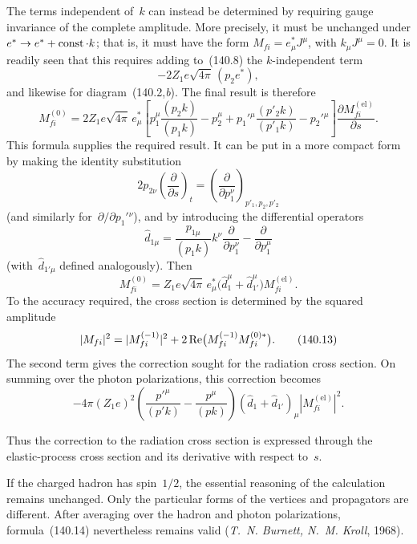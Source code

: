 The terms independent of~$k$ can instead be determined by requiring gauge invariance of the complete amplitude. More precisely, it must be unchanged under $e^*\to e^*+\mathop{\rm const}\nolimits\cdot k$; that is, it must have the form $M_{fi}=e^*_{\mu}J^\mu$, with $k_\mu J^\mu=0$. It is readily seen that this requires adding to~(140.8) the $k$-independent term
\[
-2Z_1e\sqrt{4\pi}\,(p_2e^*),
\]
and likewise for diagram~(140.2,\textit{b}). The final result is therefore
\begin{equation}
M_{fi}^{(0)}=2Z_1e\sqrt{4\pi}\,e^*_{\mu}
\left[p_1^\mu\frac{(p_2k)}{(p_1k)}-p_2^\mu
+p_1'{}^\mu\frac{(p'_2k)}{(p'_1k)}-p_2'{}^\mu\right]
\frac{\partial M_{fi}^{(\mathrm{el})}}{\partial s}.
\tag{140.10}
\end{equation}
This formula supplies the required result. It can be put in a more compact form by making the identity substitution
\[
2p_{2\nu}\left(\frac{\partial}{\partial s}\right)_t
=\left(\frac{\partial}{\partial p_1^\nu}\right)_{p'_1,p_2,p'_2}
\]
(and similarly for~$\partial/\partial p_1'{}^\nu$), and by introducing the differential operators
\begin{equation}
\widehat d_{1\mu}=\frac{p_{1\mu}}{(p_1k)}k^\nu\frac{\partial}{\partial p_1^\nu}
-\frac{\partial}{\partial p_1^\mu}
\tag{140.11}
\end{equation}
(with~$\widehat d_{1'\mu}$ defined analogously). Then
\begin{equation}
M_{fi}^{(0)}=Z_1e\sqrt{4\pi}\,e^*_{\mu}
\bigl(\widehat d_1^\mu+\widehat d_{1'}^\mu\bigr)M_{fi}^{(\mathrm{el})}.
\tag{140.12}
\end{equation}
To the accuracy required, the cross section is determined by the squared amplitude
\begin{equation}
|M_{fi}|^2=|M_{fi}^{(-1)}|^2
+2\mathop{\rm Re}\nolimits\bigl(M_{fi}^{(-1)}M_{fi}^{(0)*}\bigr).
\tag{140.13}
\end{equation}
The second term gives the correction sought for the radiation cross section. On summing over the photon polarizations, this correction becomes
\begin{equation}
-4\pi(Z_1e)^2
\left(\frac{p'^\mu}{(p'k)}-\frac{p^\mu}{(pk)}\right)
(\widehat d_1+\widehat d_{1'})_\mu|M_{fi}^{(\mathrm{el})}|^2.
\tag{140.14}
\end{equation}

Thus the correction to the radiation cross section is expressed through the elastic-process cross section and its derivative with respect to~$s$.

If the charged hadron has spin~$1/2$, the essential reasoning of the calculation remains unchanged. Only the particular forms of the vertices and propagators are different. After averaging over the hadron and photon polarizations, formula~(140.14) nevertheless remains valid (\emph{T.~N. Burnett, N.~M. Kroll}, 1968).
